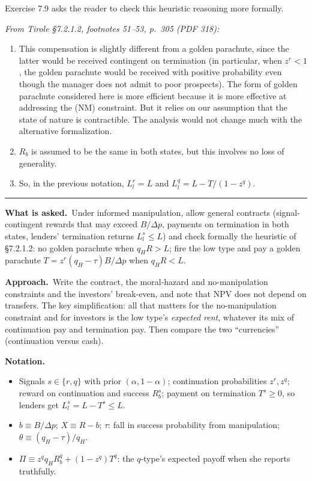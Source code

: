 \documentclass[11pt,a4paper]{article}
\newcommand{\notation}{\par\noindent\textbf{Notation.}}
\newcommand{\asked}{\par\medskip\noindent\textbf{What is asked.}~}
\newcommand{\approach}{\par\smallskip\noindent\textbf{Approach.}~}
\newcommand{\dpp}{\Delta p}
\newcommand{\stmtend}{\par\endgroup\nopagebreak\noindent\rule{\linewidth}{0.4pt}\par\medskip}
\begin{document}
Exercise 7.9 asks the reader to check this heuristic reasoning more formally.

\emph{From Tirole §7.2.1.2, footnotes 51--53, p.~305 (PDF 318):}

\begin{enumerate}
\def\labelenumi{\arabic{enumi}.}
\setcounter{enumi}{50}
\item
  This compensation is slightly different from a golden parachute, since the latter would be
  received contingent on termination (in particular, when \(z^r < 1\), the golden parachute would be
  received with positive probability even though the manager does not admit to poor prospects). The
  form of golden parachute considered here is more efficient because it is more effective at
  addressing the (NM) constraint. But it relies on our assumption that the state of nature is
  contractible. The analysis would not change much with the alternative formalization.
\item
  \(R_b\) is assumed to be the same in both states, but this involves no loss of generality.
\item
  So, in the previous notation, \(L_l^r = L\) and \(L_l^q = L - T/(1 - z^q)\).
\end{enumerate}
\stmtend

\asked Under informed manipulation, allow general contracts (signal-contingent rewards that may exceed $B/\dpp$, payments on termination in both states, lenders' termination returns $L_l^s\le L$) and check formally the heuristic of \S7.2.1.2: no golden parachute when $q_HR>L$; fire the low type and pay a golden parachute $T=z^r(q_H-\tau)B/\dpp$ when $q_HR<L$.

\approach Write the contract, the moral-hazard and no-manipulation constraints and the investors' break-even, and note that NPV does not depend on transfers. The key simplification: all that matters for the no-manipulation constraint and for investors is the low type's \emph{expected rent}, whatever its mix of continuation pay and termination pay. Then compare the two ``currencies'' (continuation versus cash).

\notation
\begin{itemize}
  \item Signals $s\in\{r,q\}$ with prior $(\alpha,1-\alpha)$; continuation probabilities $z^r,z^q$; reward on continuation and success $R_b^s$; payment on termination $T^s\ge0$, so lenders get $L_l^s=L-T^s\le L$.
  \item $b\equiv B/\dpp$; $X\equiv R-b$; $\tau$: fall in success probability from manipulation; $\theta\equiv(q_H-\tau)/q_H$.
  \item $\Pi\equiv z^qq_HR_b^q+(1-z^q)T^q$: the $q$-type's expected payoff when she reports truthfully.
\end{itemize}
\end{document}
